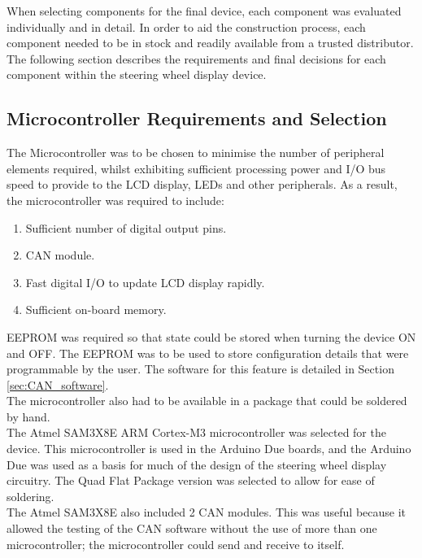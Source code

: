 \documentclass[a4paper,12pt]{article}
\begin{document}
When selecting components for the final device, each component was evaluated individually and in detail. In order to aid the construction process, each component needed to be in stock and readily available from a trusted distributor. The following section describes the requirements and final decisions for each component within the steering wheel display device. \\

\subsection{Microcontroller Requirements and Selection}
\label{sec:microcontroller}

The Microcontroller was to be chosen to minimise the number of peripheral elements required, whilst exhibiting sufficient processing power and I/O bus speed to provide to the LCD display, LEDs and other peripherals. As a result, the microcontroller was required to include:

\begin{enumerate}
  \item Sufficient number of digital output pins.
  \item CAN module.
  \item Fast digital I/O to update LCD display rapidly.
  \item Sufficient on-board memory.
\end{enumerate}
\vspace{1cm}

EEPROM was required so that state could be stored when turning the device ON and OFF. The EEPROM was to be used to store configuration details that were programmable by the user. The software for this feature is detailed in Section \ref{sec:CAN_software}. \\

The microcontroller also had to be available in a package that could be soldered by hand. \\

The Atmel SAM3X8E ARM Cortex-M3 microcontroller was selected for the device. This microcontroller is used in the Arduino Due boards, and the Arduino Due was used as a basis for much of the design of the steering wheel display circuitry. The Quad Flat Package version was selected to allow for ease of soldering. \\

The Atmel SAM3X8E also included 2 CAN modules. This was useful because it allowed the testing of the CAN software without the use of more than one microcontroller; the microcontroller could send and receive to itself. \\
\end{document}
